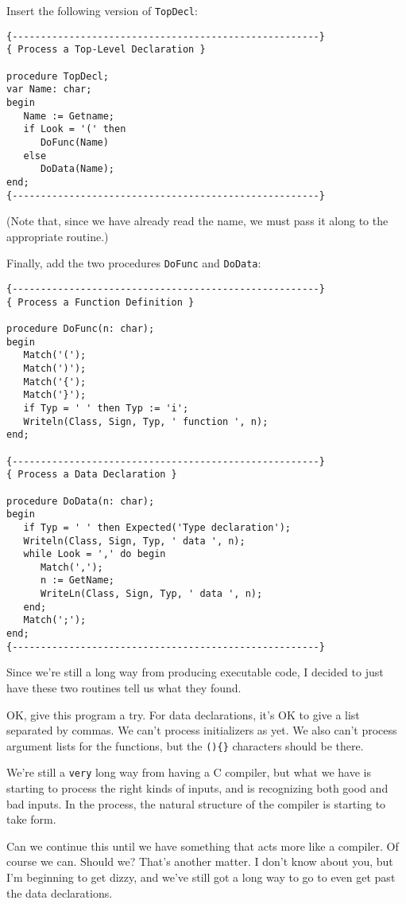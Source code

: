 Insert the following version of {\tt TopDecl}:

\begin{verbatim}
{------------------------------------------------------}
{ Process a Top-Level Declaration }

procedure TopDecl;
var Name: char;
begin
   Name := Getname;
   if Look = '(' then
      DoFunc(Name)
   else
      DoData(Name);
end;
{------------------------------------------------------}
\end{verbatim}

(Note that, since we have already read the name, we must  pass it along to the appropriate routine.)

Finally, add the two procedures {\tt DoFunc} and {\tt DoData}:

\begin{verbatim}
{------------------------------------------------------}
{ Process a Function Definition }

procedure DoFunc(n: char);
begin
   Match('(');
   Match(')');
   Match('{');
   Match('}');
   if Typ = ' ' then Typ := 'i';
   Writeln(Class, Sign, Typ, ' function ', n);
end;

{------------------------------------------------------}
{ Process a Data Declaration }

procedure DoData(n: char);
begin
   if Typ = ' ' then Expected('Type declaration');
   Writeln(Class, Sign, Typ, ' data ', n);
   while Look = ',' do begin
      Match(',');
      n := GetName;
      WriteLn(Class, Sign, Typ, ' data ', n);
   end;
   Match(';');
end;
{------------------------------------------------------}
\end{verbatim}

Since  we're  still  a long way from producing executable code, I decided to just have these two routines tell us what they found.

OK, give this program a try. For data declarations, it's OK to give a list separated by commas. We  can't  process initializers as yet. We also can't process argument lists for  the functions, but the \verb|(){}| characters should be there.

We're still a {\tt very}  long way from having a C compiler, but what we have is starting to process the right kinds of inputs, and is recognizing both good  and  bad  inputs. In  the  process, the natural structure of the compiler is starting to take form.

Can we continue this until we have something that acts  more like a compiler. Of course we can. Should we?  That's another matter. I don't know about you, but I'm beginning to get dizzy, and we've still  got  a  long  way  to  go  to  even  get  past   the  data declarations.

